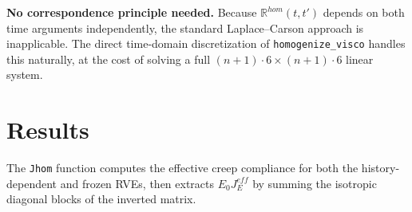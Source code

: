 \documentclass[
  a4paper,
  numbers=noendperiod,
  DIV=12]{scrreprt}
\begin{document}
\begin{tcolorbox}[enhanced jigsaw, arc=.35mm, bottomrule=.15mm, bottomtitle=1mm, breakable, colback=white, colbacktitle=quarto-callout-note-color!10!white, colframe=quarto-callout-note-color-frame, coltitle=black, left=2mm, leftrule=.75mm, opacityback=0, opacitybacktitle=0.6, rightrule=.15mm, title=\textcolor{quarto-callout-note-color}{\faInfo}\hspace{0.5em}{Note}, titlerule=0mm, toprule=.15mm, toptitle=1mm]

\textbf{No correspondence principle needed.} Because
\(\mathbb{R}^{hom}(t,t')\) depends on both time arguments independently,
the standard Laplace--Carson approach is inapplicable. The direct
time-domain discretization of \texttt{homogenize\_visco} handles this
naturally, at the cost of solving a full
\((n+1)\cdot 6 \times (n+1)\cdot 6\) linear system.

\end{tcolorbox}

\section{Results}\label{sec-ageing-results}

The \texttt{Jhom} function computes the effective creep compliance for
both the history-dependent and frozen RVEs, then extracts
\(E_0 J^{eff}_E\) by summing the isotropic diagonal blocks of the
inverted matrix.
\end{document}
